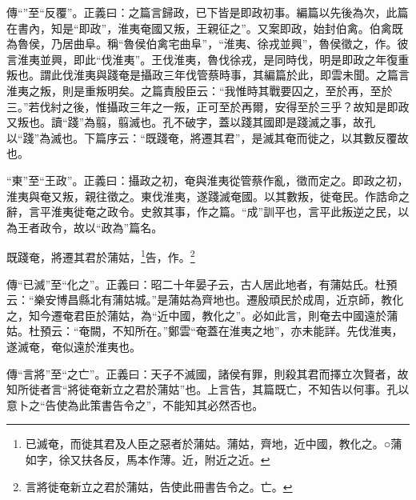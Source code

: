 {\noindent\zhuan{}\fzbyks 傳“”至“反覆”。正義曰：之篇言歸政，已下皆是即政初事。編篇以先後為次，此篇在書內，知是“即政”，淮夷奄國又叛，王親征之”。又案即政，始封伯禽。伯禽既為魯侯，乃居曲阜。稱“魯侯伯禽宅曲阜”，“淮夷、徐戎並興”，魯侯徵之，作。彼言淮夷並興，即此“伐淮夷”。王伐淮夷，魯伐徐戎，是同時伐，明是即政之年復重叛也。謂此伐淮夷與踐奄是攝政三年伐管蔡時事，其編篇於此，即雲未聞。之篇言淮夷之叛，則是重叛明矣。之篇責殷臣云：“我惟時其戰要囚之，至於再，至於三。”若伐紂之後，惟攝政三年之一叛，正可至於再爾，安得至於三乎？故知是即政又叛也。讀“踐”為翦，翦滅也。孔不破字，蓋以踐其國即是踐滅之事，故孔以“踐”為滅也。下篇序云：“既踐奄，將遷其君”，是滅其奄而徙之，以其數反覆故也。 \par}

{\noindent\shu{}\fzkt “東”至“王政”。正義曰：攝政之初，奄與淮夷從管蔡作亂，徵而定之。即政之初，淮夷與奄又叛，親往徵之。東伐淮夷，遂踐滅奄國。以其數叛，徙奄民。作誥命之辭，言平淮夷徙奄之政令。史敘其事，作之篇。“成”訓平也，言平此叛逆之民，以為王者政令，故以“政為”篇名。 \par}

既踐奄，將遷其君於蒲姑，\footnote{已滅奄，而徙其君及人臣之惡者於蒲姑。蒲姑，齊地，近中國，教化之。○蒲如字，徐又扶各反，馬本作薄。近，附近之近。}告，作。\footnote{言將徙奄新立之君於蒲姑，告使此冊書告令之。亡。}


{\noindent\zhuan{}\fzbyks 傳“已滅”至“化之”。正義曰：昭二十年晏子云，古人居此地者，有蒲姑氏。杜預云：“樂安博昌縣北有蒲姑城。”是蒲姑為齊地也。遷殷頑民於成周，近京師，教化之，知今遷奄君臣於蒲姑，為“近中國，教化之”。必如此言，則奄去中國遠於蒲姑。杜預云：“奄闕，不知所在。”鄭雲“奄蓋在淮夷之地”，亦未能詳。先伐淮夷，遂滅奄，奄似遠於淮夷也。 \par}

{\noindent\zhuan{}\fzbyks 傳“言將”至“之亡”。正義曰：天子不滅國，諸侯有罪，則殺其君而擇立次賢者，故知所徙者言“將徙奄新立之君於蒲姑”也。上言告，其篇既亡，不知告以何事。孔以意卜之“告使為此策書告令之”，不能知其必然否也。 \par}

